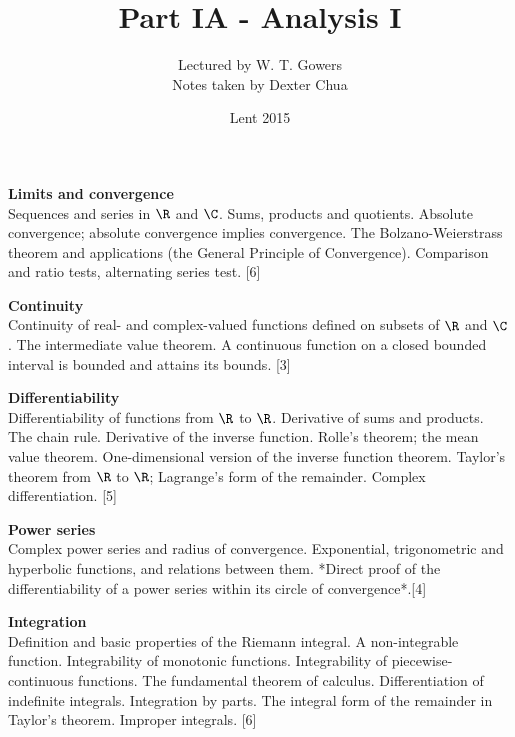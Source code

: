 \documentclass[a4paper]{article}
\title{Part IA - Analysis I}
\author{Lectured by W. T. Gowers\\\small Notes taken by Dexter Chua}
\date{Lent 2015}
\begin{document}
\maketitle
{\small
\noindent\textbf{Limits and convergence}\\
Sequences and series in $\R$ and $\C$. Sums, products and quotients. Absolute convergence; absolute convergence implies convergence. The Bolzano-Weierstrass theorem and applications (the General Principle of Convergence). Comparison and ratio tests, alternating series test.\hspace*{\fill} [6]

\vspace{10pt}
\noindent\textbf{Continuity}\\
Continuity of real- and complex-valued functions defined on subsets of $\R$ and $\C$. The intermediate value theorem. A continuous function on a closed bounded interval is bounded and attains its bounds.\hspace*{\fill} [3]

\vspace{10pt}
\noindent\textbf{Differentiability}\\
Differentiability of functions from $\R$ to $\R$. Derivative of sums and products. The chain rule. Derivative of the inverse function. Rolle's theorem; the mean value theorem. One-dimensional version of the inverse function theorem. Taylor's theorem from $\R$ to $\R$; Lagrange’s form of the remainder. Complex differentiation.\hspace*{\fill} [5]

\vspace{10pt}
\noindent\textbf{Power series}\\
Complex power series and radius of convergence. Exponential, trigonometric and hyperbolic functions, and relations between them. *Direct proof of the differentiability of a power series within its circle of convergence*.\hspace*{\fill}[4]

\vspace{10pt}
\noindent\textbf{Integration}\\
Definition and basic properties of the Riemann integral. A non-integrable function. Integrability of monotonic functions. Integrability of piecewise-continuous functions. The fundamental theorem of calculus. Differentiation of indefinite integrals. Integration by parts. The integral form of the remainder in Taylor's theorem. Improper integrals.\hspace*{\fill} [6]}
\end{document}
